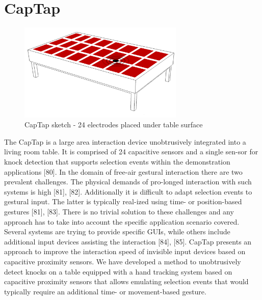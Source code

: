 \section{CapTap}
\begin{figure}[h]
\centering
\includegraphics[width=0.7\textwidth]{images/captap_v2}
\caption{CapTap sketch - 24 electrodes placed under table surface}
\label{fig:captap_sketch}
\end{figure}
The CapTap is a large area interaction device unobtrusively integrated into a living room table. It is comprised of 24 capacitive sensors and a single sen-sor for knock detection that supports selection events within the demonstration applications [80]. In the domain of free-air gestural interaction there are two prevalent challenges. The physical demands of pro-longed interaction with such systems  is high [81], [82]. Additionally it is difficult to adapt selection events to gestural input. The latter is typically real-ized using time- or position-based gestures [81], [83]. There is no trivial solution to these challenges and any approach has to take into account the specific application scenario covered. Several systems are trying to provide specific GUIs, while others include additional input devices assisting the interaction [84], [85]. CapTap presents an approach to improve the interaction speed of invisible input devices based on capacitive proximity sensors. We have developed a method to unobtrusively detect knocks on a table equipped with a hand tracking system based on capacitive proximity sensors that allows emulating selection events that would typically require an additional time- or movement-based gesture. 
